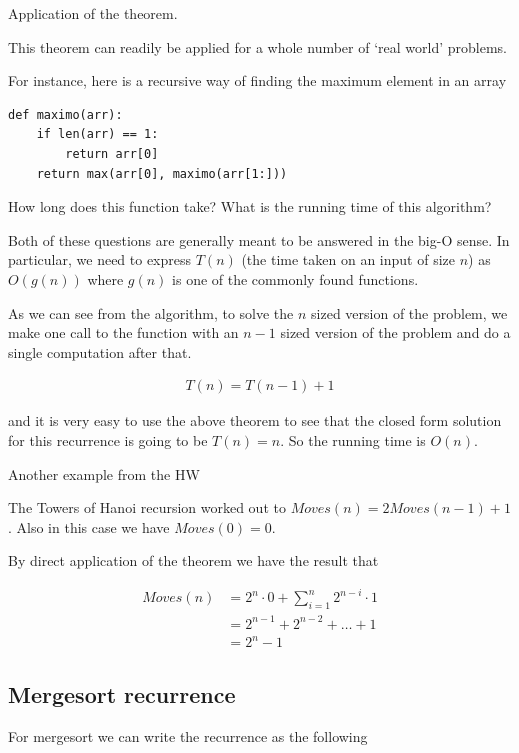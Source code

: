 \documentclass[12pt]{article}
\begin{document}
Application of the theorem.

This theorem can readily be applied for a whole number of `real world' problems.

For instance, here is a recursive way of finding the maximum element in an array

\begin{verbatim}
def maximo(arr):
    if len(arr) == 1:
        return arr[0]
    return max(arr[0], maximo(arr[1:]))
\end{verbatim}

How long does this function take? What is the running time of this algorithm? 

Both of these questions are generally meant to be answered in the big-O sense. In particular, we need to express $T(n)$ (the time taken on an input of size $n$) as $O(g(n))$ where $g(n)$ is one of the commonly found functions.

As we can see from the algorithm, to solve the $n$ sized version of the problem, we make one call to the function with an $n-1$ sized version of the problem and do a single computation after that.

\begin{align*}
T(n) = T(n-1) + 1
\end{align*}

and it is very easy to use the above theorem to see that the closed form solution for this recurrence is going to be $T(n) = n$. So the running time is $O(n)$.

\medskip

Another example from the HW

The Towers of Hanoi recursion worked out to $Moves(n) = 2Moves(n-1) + 1$. Also in this case we have $Moves(0) = 0$.

By direct application of the theorem we have the result that

\begin{align*}
Moves(n) &= 2^n \cdot 0+ \sum_{i=1}^n 2^{n-i} \cdot 1 \\
&=  2^{n-1} + 2^{n-2} + \ldots + 1 \\
&= 2^{n} - 1
\end{align*}

\subsection*{Mergesort recurrence}

For mergesort we can write the recurrence as the following
\end{document}
